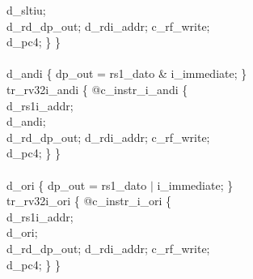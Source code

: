 {\indent \hspace{\parindent} d\_sltiu; \\%
\indent \hspace{\parindent} d\_rd\_dp\_out; d\_rdi\_addr; c\_rf\_write;  \\%
\indent \hspace{\parindent} d\_pc4; \} \} \\%
\\
\indent d\_andi \{ dp\_out = rs1\_dato \& i\_immediate; \}\\%
\indent tr\_rv32i\_andi \{ @c\_instr\_i\_andi \{ \\%
\indent \hspace{\parindent} d\_rs1i\_addr; \\%
\indent \hspace{\parindent} d\_andi; \\%
\indent \hspace{\parindent} d\_rd\_dp\_out; d\_rdi\_addr; c\_rf\_write;  \\%
\indent \hspace{\parindent} d\_pc4; \} \} \\%
\\
\indent d\_ori \{ dp\_out = rs1\_dato $\vert$ i\_immediate; \}\\%
\indent tr\_rv32i\_ori \{ @c\_instr\_i\_ori \{ \\%
\indent \hspace{\parindent} d\_rs1i\_addr; \\%
\indent \hspace{\parindent} d\_ori; \\%
\indent \hspace{\parindent} d\_rd\_dp\_out; d\_rdi\_addr; c\_rf\_write;  \\%
\indent \hspace{\parindent} d\_pc4; \} \} \\%
\\
}
